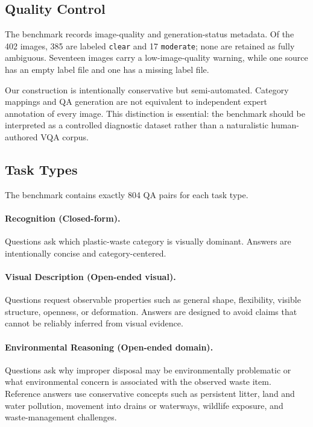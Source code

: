 \documentclass{article}
\begin{document}
\subsection{Quality Control}
\label{subsec:quality_control}

The benchmark records image-quality and generation-status metadata. Of the 402 images, 385 are labeled \texttt{clear} and 17 \texttt{moderate}; none are retained as fully ambiguous. Seventeen images carry a low-image-quality warning, while one source has an empty label file and one has a missing label file.

Our construction is intentionally conservative but semi-automated. Category mappings and QA generation are not equivalent to independent expert annotation of every image. This distinction is essential: the benchmark should be interpreted as a controlled diagnostic dataset rather than a naturalistic human-authored VQA corpus.
\subsection{Task Types}
\label{subsec:task_types}

The benchmark contains exactly 804 QA pairs for each task type.

\paragraph{Recognition (Closed-form).}
Questions ask which plastic-waste category is visually dominant. Answers are intentionally concise and category-centered.

\paragraph{Visual Description (Open-ended visual).}
Questions request observable properties such as general shape, flexibility, visible structure, openness, or deformation. Answers are designed to avoid claims that cannot be reliably inferred from visual evidence.

\paragraph{Environmental Reasoning (Open-ended domain).}
Questions ask why improper disposal may be environmentally problematic or what environmental concern is associated with the observed waste item. Reference answers use conservative concepts such as persistent litter, land and water pollution, movement into drains or waterways, wildlife exposure, and waste-management challenges.
\end{document}
